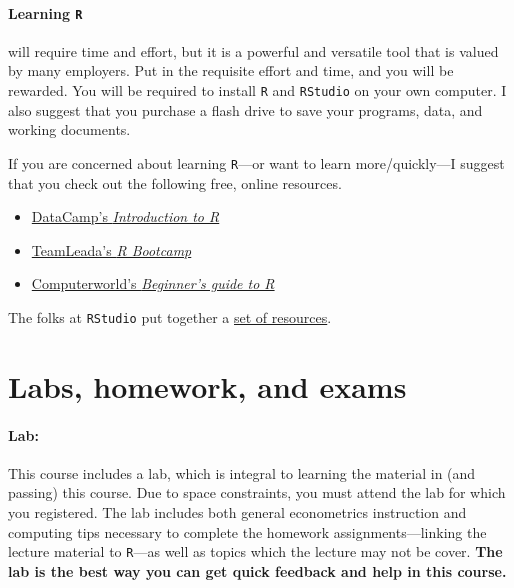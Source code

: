 \documentclass[10pt]{article}
\begin{document}
\paragraph{Learning \texttt{R}} will require time and effort, but it is a powerful and versatile tool that is valued by many employers. Put in the requisite effort and time, and you will be rewarded. You will be required to install \texttt{R} and \texttt{RStudio} on your own computer. I also suggest that you purchase a flash drive to save your programs, data, and working documents.

If you are concerned about learning \texttt{R}---or want to learn more/quickly---I suggest that you check out the following free, online resources.
\begin{itemize}
  \item \href{https://www.datacamp.com/courses/free-introduction-to-r}{DataCamp's \textit{Introduction to R}}
  \item \href{https://www.teamleada.com/courses/r-bootcamp}{TeamLeada's \textit{R Bootcamp}}
  \item \href{https://www.computerworld.com/article/2497143/business-intelligence-beginner-s-guide-to-r-introduction.html}{Computerworld's \textit{Beginner's guide to R}}
\end{itemize}
The folks at \texttt{RStudio} put together a \href{https://education.rstudio.com/learn/beginner/}{set of resources}.

\section*{Labs, homework, and exams}

\paragraph{Lab:} This course includes a lab, which is integral to learning the material in (and passing) this course. Due to space constraints, you must attend the lab for which you registered. The lab includes both general econometrics instruction and computing tips necessary to complete the homework assignments---linking the lecture material to \texttt{R}---as well as topics which the lecture may not be cover. \textbf{The lab is the best way you can get quick feedback and help in this course.}
\end{document}
